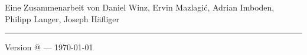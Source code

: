 \documentclass[a5paper,10pt,fleqn]{book}
\makeatletter
\newcommand*{\rom}[1]{\expandafter\@slowromancap\romannumeral #1@}
\makeatother
\begin{document}
\vfill{}

\begin{large}
	\begin{center}
		\normalfont
		\noindent
		Eine Zusammenarbeit von
			Daniel Winz,
			Ervin Mazlagi\'c,
			Adrian Imboden,
			Philipp Langer,
			Joseph Häfliger
	\end{center}
\end{large}

\begin{large}	
	\noindent\rule{\textwidth}{2pt}
	\begin{center}
		\noindent
		Version \rom{3} --- \today
	\end{center}
\end{large}
\end{document}
